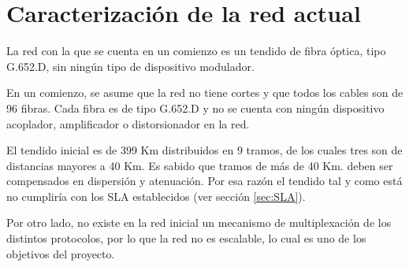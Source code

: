 \section{Caracterización de la red actual}
\label{sec:caracterizacion}

La red con la que se cuenta en un comienzo es un tendido de fibra
óptica, tipo G.652.D, sin ningún tipo de dispositivo modulador.

En un comienzo, se asume que la red no tiene cortes y que todos los
cables son de 96 fibras. Cada fibra es de tipo G.652.D y no se cuenta
con ningún dispositivo acoplador, amplificador o distorsionador en la
red.

El tendido inicial es de 399 Km distribuidos en 9 tramos, de los
cuales tres son de distancias mayores a 40 Km. Es sabido que tramos de
más de 40 Km. deben ser compensados en dispersión y atenuación. Por
esa razón el tendido tal y como está no cumpliría con los SLA
establecidos (ver sección \ref{sec:SLA}).

Por otro lado, no existe en la red inicial un mecanismo de
multiplexación de los distintos protocolos, por lo que la red no es
escalable, lo cual es uno de los objetivos del proyecto.






